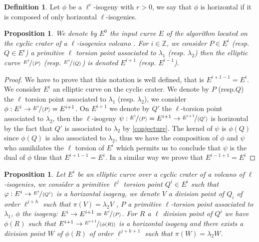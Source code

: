 \documentclass{article}
\theoremstyle{plain}
\newtheorem{prop}[thm]{Proposition}
\theoremstyle{definition}
\newtheorem{defi}[thm]{Definition}
\theoremstyle{remark}
\begin{document}
\begin{defi}
Let $\phi$ be a $\ell^r$-isogeny with $r>0$, we say that $\phi$ is horizontal if it is composed of only horizontal $\ell$-isogenies.
\end{defi}

\begin{prop}
We denote by $E^0$ the input curve $E$ of the algorithm located on the cyclic crater of a $\ell$-isogenies volcano . For $i \in \mathbb{Z}$, we consider $P \in E^i$ (resp. $Q \in E^i$) a primitive $\ell$ torsion point associated to $\lambda_1$ (resp. $\lambda_2$) then the elliptic curve $\nicefrac{E^i}{\langle P \rangle }$ (resp. $\nicefrac{E^i}{\langle Q \rangle }$) is denoted $E^{i+1}$ (resp. $E^{i-1}$).
\end{prop}

\begin{proof}
We have to prove that this notation is well defined, that is $E^{i+1-1}=E^{i}$. We consider $E^i$ an elliptic curve on the cyclic crater. We denote by $P$ (resp.$Q$) the $\ell$ torsion point associated to $\lambda_1$ (resp. $\lambda_2$), we consider $\phi: E^i\rightarrow \nicefrac{E^i}{\langle P \rangle}=E^{i+1}$. On $E^{i+1}$ we denote by $Q'$ the $\ell$-torsion point associated to $\lambda_2$, then the $\ell$-isogeny $\psi: \nicefrac{E^i}{\langle P \rangle}=E^{i+1}\rightarrow \nicefrac{E^{i+1}}{\langle Q' \rangle}$ is horizontal by the fact that $Q'$ is associated to $\lambda_2$ by \ref{conjecture}. The kernel of $\psi$ is $\phi(Q)$ since $\phi(Q)$ is also associated to $\lambda_2$, thus we have the composition of $\phi$ and $\psi$ who annihilates the $\ell$ torsion of $E^i$ which permits us to conclude that $\psi$ is the dual of $\phi$ thus that $E^{i+1-1}=E^{i}$. In a similar way we prove that $E^{i-1+1}=E^{i}$
\end{proof}

\begin{prop}\label{propcentrale}
Let $E^i$ be an elliptic curve over a cyclic crater of a volcano of $\ell$-isogenies, we consider a primitive $\ell^j$ torsion point $Q^i \in E^i$ such that $\varphi: E^i \rightarrow \nicefrac{E^i}{\langle Q^i \rangle }$ is a horizontal isogeny, we denote $V$ a division point of $Q_i$ of order $\ell^{j+h}$ such that $\pi(V)=\lambda_2V$  , $P$ a primitive $\ell$-torsion point associated to $\lambda_1$, $\phi$ the isogeny: $E^{i}\rightarrow E^{i+1}=\nicefrac{E^i}{\langle P \rangle}$. For $R$ a $\ell$ division point of $Q^i$ we have $\phi(R)$ such that $E^{i+1} \rightarrow \nicefrac{E^{i+1}}{\langle \phi(R) \rangle}$ is a horizontal isogeny and there exists a division point $W$ of $\phi(R)$ of order $\ell^{j+h+1}$ such that $\pi(W)=\lambda_2W$.  
\end{prop}
\end{document}
